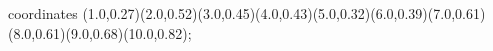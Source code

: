 					coordinates { (1.0,0.27)(2.0,0.52)(3.0,0.45)(4.0,0.43)(5.0,0.32)(6.0,0.39)(7.0,0.61)(8.0,0.61)(9.0,0.68)(10.0,0.82)};